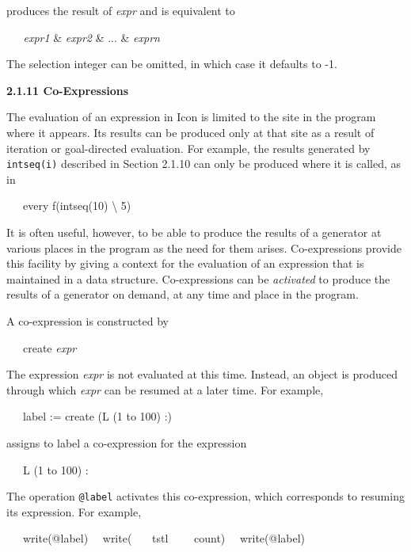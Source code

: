\noindent
produces the result of \textit{expr} and is equivalent to


\textit{\ \ \ expr1 }\& \textit{expr2 }\& ... \& \textit{exprn}

The selection integer can be omitted, in which case it defaults to -1.


{\sffamily\bfseries
2.1.11 Co-Expressions}

The evaluation of an expression in Icon is limited to the site in the
program where it appears. Its results can be produced only at that
site as a result of iteration or goal-directed evaluation. For
example, the results generated by \texttt{intseq(i)} described in
Section 2.1.10 can only be produced where it is called, as in

{\ttfamily\mdseries
\ \ \ every f(intseq(10) {\textbackslash} 5)}

It is often useful, however, to be able to produce the results of a
generator at various places in the program as the need for them
arises. Co-expressions provide this facility by giving a context for
the evaluation of an expression that is maintained in a data
structure. Co-expressions can be \textit{activated }to produce the
results of a generator on demand, at any time and place in the
program.

A co-expression is constructed by

\ \ \ create \textit{expr}

The expression \textit{expr} is not evaluated at this time. Instead,
an object is produced through which \textit{expr} can be resumed at a
later time. For example,

{\ttfamily\mdseries
\ \ \ label := create ({\textquotedbl}L{\textquotedbl} {\textbar}{\textbar} (1 to 100) {\textbar}{\textbar}
{\textquotedbl}:{\textquotedbl})}

\noindent assigns to label a co-expression for the expression

{\ttfamily\mdseries
\ \ \ {\textquotedbl}L{\textquotedbl} {\textbar}{\textbar} (1 to 100) {\textbar}{\textbar}
{\textquotedbl}:{\textquotedbl}}

The operation \texttt{@label} activates this co-expression, which
corresponds to resuming its expression. For example,

{\ttfamily\mdseries
\ \ \ write(@label)\newline
 \ \ write({\textquotedbl} \ \ \ tstl \ \ \ \ count{\textquotedbl})\newline
 \ \ write(@label)}

